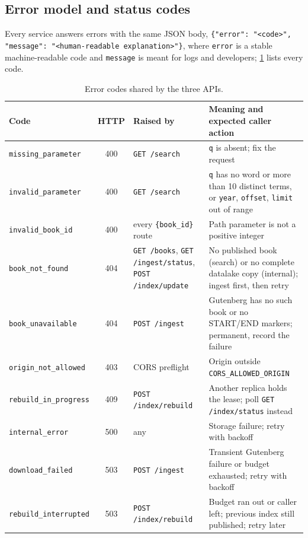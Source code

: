\documentclass[10pt,a4paper]{article}
\newcommand{\code}[1]{\texttt{#1}}
\newcommand{\route}[1]{\texttt{#1}}
\begin{document}
\subsection{Error model and status codes}
\label{sec:errors}

Every service answers errors with the same JSON body,
\code{\{"error": "<code>", "message": "<human-readable explanation>"\}}, where
\code{error} is a stable machine-readable code and \code{message} is meant for
logs and developers; \cref{tab:errors} lists every code.

\begin{table}[htbp]
  \centering
  \footnotesize
  \caption{Error codes shared by the three APIs.}
  \label{tab:errors}
  \begin{tabularx}{\textwidth}{@{}lc>{\raggedright\arraybackslash}p{4.3cm}>{\raggedright\arraybackslash}X@{}}
    \toprule
    Code & HTTP & Raised by & Meaning and expected caller action \\
    \midrule
    \code{missing\_parameter} & 400 & \route{GET /search} & \code{q} is absent; fix the request \\
    \code{invalid\_parameter} & 400 & \route{GET /search} & \code{q} has no word or more than 10
      distinct terms, or \code{year}, \code{offset}, \code{limit} out of range \\
    \code{invalid\_book\_id} & 400 & every \code{\{book\_id\}} route & Path parameter is not a positive integer \\
    \code{book\_not\_found} & 404 & \route{GET /books}, \route{GET /ingest/status},
      \route{POST /index/update} & No published book (search) or no complete
      datalake copy (internal); ingest first, then retry \\
    \code{book\_unavailable} & 404 & \route{POST /ingest} & Gutenberg has no such
      book or no START/END markers; permanent, record the failure \\
    \code{origin\_not\_allowed} & 403 & CORS preflight & Origin outside
      \code{CORS\_ALLOWED\_ORIGIN} \\
    \code{rebuild\_in\_progress} & 409 & \route{POST /index/rebuild} & Another
      replica holds the lease; poll \route{GET /index/status} instead \\
    \code{internal\_error} & 500 & any & Storage failure; retry with backoff \\
    \code{download\_failed} & 503 & \route{POST /ingest} & Transient Gutenberg
      failure or budget exhausted; retry with backoff \\
    \code{rebuild\_interrupted} & 503 & \route{POST /index/rebuild} & Budget ran
      out or caller left; previous index still published; retry later \\
    \bottomrule
  \end{tabularx}
\end{table}
\end{document}
